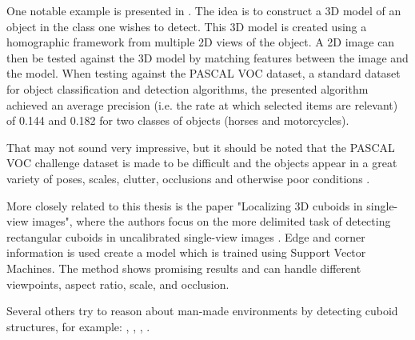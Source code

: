
One notable example is presented in \cite{yan20073d}. The idea is to construct a 3D model of an object in the class one wishes to detect.
This 3D model is created using a homographic framework from  multiple 2D views of the object.
A 2D image can then be tested against the 3D model by matching features between the image and the model. 
When testing against the PASCAL VOC dataset, a standard dataset for object classification and detection algorithms, the presented algorithm achieved an average precision (i.e. the rate at which selected items are relevant) of 0.144 and 0.182 for two classes of objects (horses and motorcycles). 

That may not sound very impressive, but it should be noted that the PASCAL VOC challenge dataset is made to be difficult and the objects appear in a great variety of poses, scales, clutter, occlusions and otherwise poor conditions \cite{everingham2010pascal}.

More closely related to this thesis is the paper "Localizing 3D cuboids in single-view images", where the authors focus on the more delimited task of detecting rectangular cuboids in uncalibrated single-view images \cite{xiaolocalizing}.
Edge and corner information is used create a model which is trained using Support Vector Machines.
The method shows promising results and can handle different viewpoints, aspect ratio, scale, and occlusion.

Several others try to reason about man-made environments by detecting cuboid structures, for example: \cite{hedau2010thinking}, \cite{hedau2012recovering}, \cite{gupta2010estimating}, \cite{del2012bayesian}.

